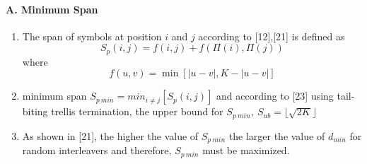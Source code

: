 \documentclass[fontsize=12pt]{article}
\begin{document}
\paragraph{A. Minimum Span \newline}
\begin{enumerate}
\item The span of symbols at position $i$ and $j$ according to [12],[21] is defined as
$$S_p(i,j) = f(i,j) + f(\Pi(i),\Pi(j))$$ where $$ f(u,v) =\min[|u-v|,K-|u-v|] $$

\item minimum span $S_{p~min}=min_{i \neq j}[S_p(i,j)]$ and according to [23] using tail-biting trellis termination, the upper bound for $S_{p~min},~S_{ub}=\lfloor \sqrt{2K} \rfloor$ 

\item As shown in [21], the higher the value of $S_{p~min}$ the larger the value of $d_{min}$ for random interleavers and therefore, $S_{p~min}$ must be maximized.
\end{enumerate}
\end{document}

